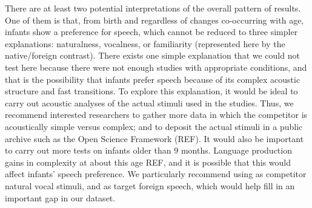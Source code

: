 \documentclass[man]{apa6}
\begin{document}
There are at least two potential interpretations of the overall pattern
of results. One of them is that, from birth and regardless of changes
co-occurring with age, infants show a preference for speech, which
cannot be reduced to three simpler explanations: naturalness, vocalness,
or familiarity (represented here by the native/foreign contrast). There
exists one simple explanation that we could not test here because there
were not enough studies with appropriate conditions, and that is the
possibility that infants prefer speech because of its complex acoustic
structure and fast transitions. To explore this explanation, it would be
ideal to carry out acoustic analyses of the actual stimuli used in the
studies. Thus, we recommend interested researchers to gather more data
in which the competitor is acoustically simple versus complex; and to
deposit the actual stimuli in a public archive such as the Open Science
Framework (REF). It would also be important to carry out more tests on
infants older than 9 months. Language production gains in complexity at
about this age REF, and it is possible that this would affect infants'
speech preference. We particularly recommend using as competitor natural
vocal stimuli, and as target foreign speech, which would help fill in an
important gap in our dataset.
\end{document}
